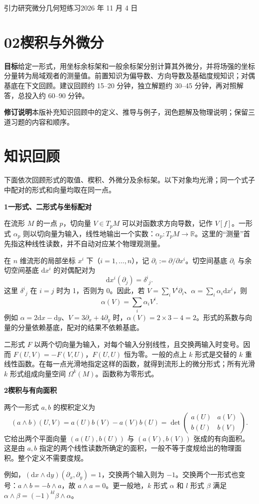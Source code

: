 \documentclass[11pt,a4paper]{article}
\newcommand{\D}{\mathrm d}
\newcommand{\head}[1]{\section*{\color{teal}#1}}
\begin{document}
{\large 引力研究微分几何短练习\hfill 2026 年 11 月 4 日}
\head{02\quad 楔积与外微分}
\textbf{目标}\quad 给定一形式，用坐标余标架和一般余标架分别计算其外微分，并将场强的坐标分量转为局域观者的测量值。前置知识为偏导数、方向导数及基础度规知识；对偶基底在下文回顾。建议回顾约 15--20 分钟，独立解题约 30--45 分钟，再对照解答，总投入约 60--90 分钟。
\par\textbf{修订说明}\quad 本版补充知识回顾中的定义、推导与例子，润色题解及物理说明；保留三道习题的内容和顺序。

\head{知识回顾}
下面依次回顾形式的取值、楔积、外微分及余标架。以下对象均光滑；同一个式子中配对的形式和向量均取在同一点。

\textbf{1\quad 一形式、二形式与坐标配对}

在流形 $M$ 的一点 $p$，切向量 $V\in T_pM$ 可以对函数求方向导数，记作 $V[f]$。一形式 $\alpha_p$ 则以切向量为输入，线性地输出一个实数：$\alpha_p:T_pM\to\mathbb R$。这里的“测量”首先指这种线性读数，并不自动对应某个物理观测量。

在 $n$ 维流形的局部坐标 $x^i$ 下（$i=1,\ldots,n$），记 $\partial_i:=\partial/\partial x^i$。切空间基底 $\partial_i$ 与余切空间基底 $\D x^i$ 的对偶配对为
\[
 \D x^i(\partial_j)=\delta^i{}_j.
\]
这里 $\delta^i{}_j$ 在 $i=j$ 时为 1，否则为 0。因此，若 $V=\sum_i V^i\partial_i$、$\alpha=\sum_i\alpha_i\D x^i$，则
\[
 \alpha(V)=\sum_i\alpha_i V^i.
\]
例如 $\alpha=2\D x-\D y$、$V=3\partial_x+4\partial_y$ 时，$\alpha(V)=2\times3-4=2$。形式的系数与向量的分量依赖基底，配对的结果不依赖基底。

二形式 $F$ 以两个切向量为输入，对每个输入分别线性，且交换两输入时变号。因而 $F(U,V)=-F(V,U)$，$F(U,U)$ 恒为零。一般的点上 $k$ 形式是交替的 $k$ 重线性函数。在每一点光滑地指定这样的函数，就得到流形上的微分形式；所有光滑 $k$ 形式组成向量空间 $\Omega^k(M)$。函数称为零形式。

\textbf{2\quad 楔积与有向面积}

两个一形式 $a,b$ 的楔积定义为
\[
 (a\wedge b)(U,V)=a(U)b(V)-a(V)b(U)
 =\det\begin{pmatrix}a(U)&a(V)\\ b(U)&b(V)\end{pmatrix}.
\]
它给出两个平面向量 $(a(U),b(U))$ 与 $(a(V),b(V))$ 张成的有向面积。这是由 $a,b$ 指定的两个线性读数所确定的面积，一般不等于度规给出的物理面积。整个定义不需要度规。

例如，$(\D x\wedge\D y)(\partial_x,\partial_y)=1$，交换两个输入则为 $-1$。交换两个一形式也变号：$a\wedge b=-b\wedge a$，故 $a\wedge a=0$。更一般地，$k$ 形式 $\alpha$ 和 $l$ 形式 $\beta$ 满足 $\alpha\wedge\beta=(-1)^{kl}\beta\wedge\alpha$。
\end{document}
